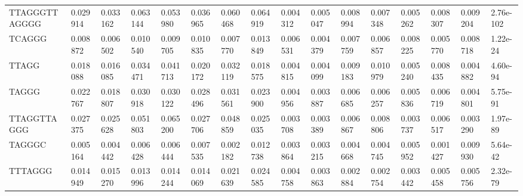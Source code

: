 \begin{samepage}
\begin{table}[h!]
\begin{tabular}{llllllllllllllll}
TTAGGGTTAGGGG     &  0.029914                                          &  0.033162                            &  0.063144                 &  0.053980        &  0.036965        &  0.060468        &  0.064919        &  0.004312        &  0.005047        &  0.008994        &  0.007348        &  0.005262        &  0.008307        &  0.009204        &  2.76e-102 \\
TCAGGG            &  0.008872                                          &  0.006502                            &  0.010540                 &  0.009705        &  0.010835        &  0.007770        &  0.013849        &  0.006531        &  0.004379        &  0.007759        &  0.006857        &  0.008225        &  0.005770        &  0.008718        &  1.22e-24 \\
TTAGG             &  0.018088                                          &  0.016085                            &  0.034471                 &  0.041713        &  0.020172        &  0.032119        &  0.018575        &  0.004815        &  0.004099        &  0.009183        &  0.010979        &  0.005240        &  0.008435        &  0.004882        &  4.60e-94 \\
TAGGG             &  0.022767                                          &  0.018807                            &  0.030918                 &  0.030122        &  0.028496        &  0.031561        &  0.023900        &  0.004956        &  0.003887        &  0.006685        &  0.006257        &  0.005836        &  0.006719        &  0.004801        &  5.75e-91 \\
TTAGGTTAGGG       &  0.027375                                          &  0.025628                            &  0.051803                 &  0.065200        &  0.027706        &  0.048859        &  0.025035        &  0.003708        &  0.003389        &  0.006867        &  0.008806        &  0.003737        &  0.006517        &  0.003290        &  1.97e-89 \\
TAGGGC            &  0.005164                                          &  0.004442                            &  0.006428                 &  0.006444        &  0.007535        &  0.002182        &  0.012738        &  0.003864        &  0.003215        &  0.004668        &  0.004745        &  0.005952        &  0.001427        &  0.009930        &  5.64e-42 \\
TTTAGGG           &  0.014949                                          &  0.015270                            &  0.013996                 &  0.014244        &  0.014069        &  0.021639        &  0.024585        &  0.004758        &  0.003863        &  0.002884        &  0.002754        &  0.003442        &  0.005458        &  0.005756        &  2.32e-79 \\

\end{tabular}
\end{table}
\end{samepage}

